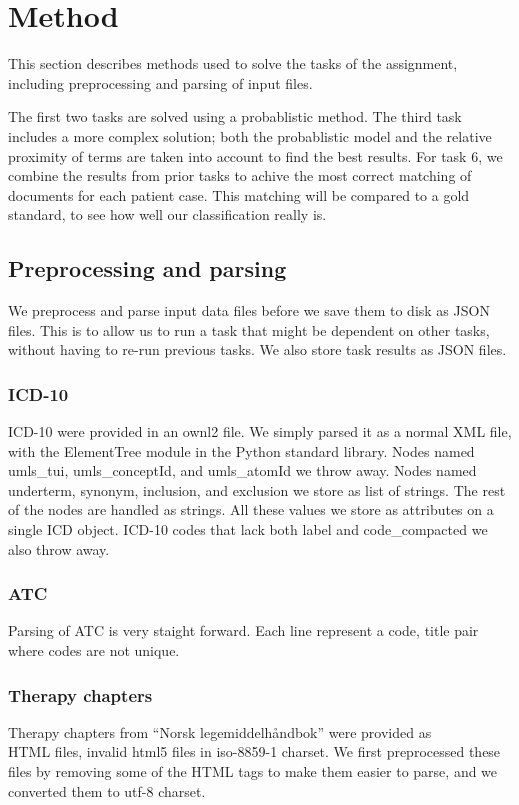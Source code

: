 \chapter{Method}
\label{cha:method}
This section describes methods used to solve the tasks of the assignment, including
preprocessing and parsing of input files. 

The first two tasks are solved using a probablistic method. The third task includes a more complex solution; both the probablistic model and the relative proximity of terms are taken into account to find the best results. For task 6, we combine the results from prior tasks to achive the most correct matching of documents for each patient case. This matching will be compared to a gold standard, to see how well our classification really is. 

\section{Preprocessing and parsing}
We preprocess and parse input data files before we save them to disk as JSON
files. This is to allow us to run a task that might be dependent on other tasks, without having to re-run previous tasks. We also store task
results as JSON files.

\subsection{ICD-10}
ICD-10 were provided in an ownl2 file. We simply parsed it as a normal XML
file, with the ElementTree module in the Python standard library.
Nodes named umls\_tui, umls\_conceptId, and umls\_atomId we throw away.
Nodes named underterm, synonym, inclusion, and exclusion we store as list of
strings. The rest of the nodes are handled as strings. All these values we
store as attributes on a single ICD object. ICD-10 codes that lack both label
and code\_compacted we also throw away.

\subsection{ATC}
Parsing of ATC is very staight forward. Each line represent a code, title
pair where codes are not unique.

\subsection{Therapy chapters}
Therapy chapters from ``Norsk legemiddelhåndbok'' were provided as\\
HTML files, invalid html5 files in iso-8859-1 charset. We first preprocessed
these files by removing some of the HTML tags to make them easier to parse,
and we converted them to utf-8 charset.

